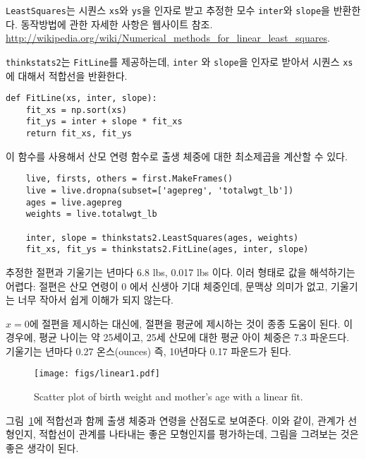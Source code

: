 {\tt LeastSquares}는 시퀀스 {\tt xs}와 {\tt ys}을 인자로 받고 추정한 모수 {\tt inter}와
{\tt slope}을 반환한다. 동작방법에 관한 자세한 사항은 웹사이트 참조. \url{http://wikipedia.org/wiki/Numerical_methods_for_linear_least_squares}.


{\tt thinkstats2}는 {\tt FitLine}를 제공하는데, {\tt inter} 와 {\tt slope}을 인자로 받아서 시퀀스 {\tt xs}에 대해서 적합선을 반환한다.

\begin{verbatim}
def FitLine(xs, inter, slope):
    fit_xs = np.sort(xs)
    fit_ys = inter + slope * fit_xs
    return fit_xs, fit_ys
\end{verbatim}

이 함수를 사용해서 산모 연령 함수로 출생 체중에 대한 최소제곱을 계산할 수 있다.

\begin{verbatim}
    live, firsts, others = first.MakeFrames()
    live = live.dropna(subset=['agepreg', 'totalwgt_lb'])
    ages = live.agepreg
    weights = live.totalwgt_lb

    inter, slope = thinkstats2.LeastSquares(ages, weights)
    fit_xs, fit_ys = thinkstats2.FitLine(ages, inter, slope)
\end{verbatim}

추정한 절편과 기울기는 년마다 6.8 lbs, 0.017 lbs 이다.
이러 형태로 값을 해석하기는 어렵다: 절편은 산모 연령이 0 에서 신생아 기대 체중인데,
문맥상 의미가 없고, 기울기는 너무 작아서 쉽게 이해가 되지 않는다.


$x=0$에 절편을 제시하는 대신에, 절편을 평균에 제시하는 것이 종종 도움이 된다.
이 경우에, 평균 나이는 약 25세이고, 25세 산모에 대한 평균 아이 체중은 7.3 파운드다.
기울기는 년마다 0.27 온스(ounces) 즉, 10년마다 0.17 파운드가 된다.

\begin{figure}
\centerline{\texttt{[image: figs/linear1.pdf]}}
\caption{Scatter plot of birth weight and mother's age with
a linear fit.}
\label{linear1}
\end{figure}

그림~\ref{linear1}에 적합선과 함께 출생 체중과 연령을 산점도로 보여준다.
이와 같이, 관계가 선형인지, 적합선이 관계를 나타내는 좋은 모형인지를 평가하는데, 그림을 그려보는 것은 좋은 생각이 된다. 



